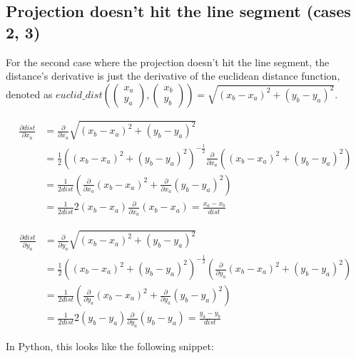 \documentclass[fleqn]{article}
\begin{document}
\subsection{Projection doesn't hit the line segment (cases 2, 3)}

For the second case where the projection doesn't hit the line segment, the
distance's derivative is just the derivative of the euclidean distance function,
denoted as $euclid\_dist(\begin{pmatrix} x_a \\ y_a \end{pmatrix}, \begin{pmatrix} x_b \\ y_b \end{pmatrix})
= \sqrt{(x_b - x_a)^2 + (y_b - y_a)^2}$.

\begin{equation}
\begin{aligned}
    \frac{\partial dist}{\partial x_a}
    &= \frac{\partial}{\partial x_a} \sqrt{(x_b - x_a)^2 + (y_b - y_a)^2} \\
    &= \frac{1}{2} ((x_b - x_a)^2 + (y_b - y_a)^2)^{-\frac{1}{2}} \frac{\partial}{\partial x_a} ((x_b - x_a)^2 + (y_b - y_a)^2) \\
    &= \frac{1}{2 dist} (\frac{\partial}{\partial x_a} (x_b - x_a)^2 + \frac{\partial}{\partial x_a} (y_b - y_a)^2) \\
    &= \frac{1}{2 dist} 2 (x_b - x_a) \frac{\partial}{\partial x_a} (x_b - x_a)
    = \frac{x_a - x_b}{dist}
\end{aligned}
\end{equation}

\begin{equation}
\begin{aligned}
    \frac{\partial dist}{\partial y_a}
    &= \frac{\partial}{\partial y_a} \sqrt{(x_b - x_a)^2 + (y_b - y_a)^2} \\
    &= \frac{1}{2} ((x_b - x_a)^2 + (y_b - y_a)^2)^{-\frac{1}{2}} (\frac{\partial}{\partial y_a} (x_b - x_a)^2 + (y_b - y_a)^2) \\
    &= \frac{1}{2 dist} (\frac{\partial}{\partial y_a} (x_b - x_a)^2 + \frac{\partial}{\partial y_a} (y_b - y_a)^2) \\
    &= \frac{1}{2 dist} 2 (y_b - y_a) \frac{\partial}{\partial y_a} (y_b - y_a)
    = \frac{y_a - y_b}{dist}
\end{aligned}
\end{equation}

In Python, this looks like the following snippet:
\end{document}
